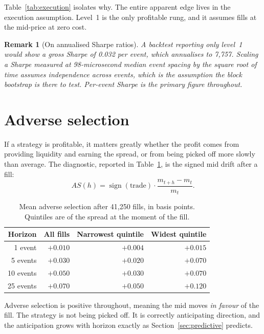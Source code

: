 \documentclass[11pt]{scrartcl}
\newtheorem{remark}{Remark}[section]
\begin{document}
Table~\ref{tab:execution} isolates why. The entire apparent edge lives in the execution assumption. Level~1 is the only profitable rung, and it assumes fills at the mid-price at zero cost.

\begin{remark}[On annualised Sharpe ratios]
A backtest reporting only level~1 would show a gross Sharpe of 0.032 per event, which annualises to 7{,}757. Scaling a Sharpe measured at 98-microsecond median event spacing by the square root of time assumes independence across events, which is the assumption the block bootstrap is there to test. Per-event Sharpe is the primary figure throughout.
\end{remark}

\section{Adverse selection}
\label{sec:adverse}

If a strategy is profitable, it matters greatly whether the profit comes from providing liquidity and earning the spread, or from being picked off more slowly than average. The diagnostic, reported in Table~\ref{tab:adverse}, is the signed mid drift after a fill:
\begin{equation}
AS(h) = \operatorname{sign}(\text{trade}) \cdot \frac{m_{t+h} - m_t}{m_t}.
\label{eq:adverse}
\end{equation}

\begin{table}[H]
\centering
\caption{Mean adverse selection after 41{,}250 fills, in basis points. Quintiles are of the spread at the moment of the fill.}
\label{tab:adverse}
\begin{tabular}{rrrr}
\toprule
Horizon & All fills & Narrowest quintile & Widest quintile \\
\midrule
1 event   & $+0.010$ & $+0.004$ & $+0.015$ \\
5 events  & $+0.030$ & $+0.020$ & $+0.070$ \\
10 events & $+0.050$ & $+0.030$ & $+0.070$ \\
25 events & $+0.070$ & $+0.050$ & $+0.120$ \\
\bottomrule
\end{tabular}
\end{table}

Adverse selection is positive throughout, meaning the mid moves \emph{in favour} of the fill. The strategy is not being picked off. It is correctly anticipating direction, and the anticipation grows with horizon exactly as Section~\ref{sec:predictive} predicts.
\end{document}
